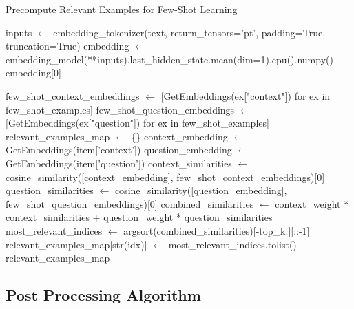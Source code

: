 \documentclass[logo,msc]{infthesis}           %
\begin{document}
\begin{algorithm}
\caption{Precompute Relevant Examples for Few-Shot Learning}
\label{alg:precomputeExamples}
\begin{algorithmic}[1]
    \State inputs $\gets$ embedding\_tokenizer(text, return\_tensors='pt', padding=True, truncation=True)
    \State embedding $\gets$ embedding\_model(**inputs).last\_hidden\_state.mean(dim=1).cpu().numpy()
    \State \Return embedding[0]
\EndFunction

    \State few\_shot\_context\_embeddings $\gets$ [GetEmbeddings(ex["context"]) for ex in few\_shot\_examples]
    \State few\_shot\_question\_embeddings $\gets$ [GetEmbeddings(ex["question"]) for ex in few\_shot\_examples]
    \State relevant\_examples\_map $\gets$ \{\}
        \State context\_embedding $\gets$ GetEmbeddings(item['context'])
        \State question\_embedding $\gets$ GetEmbeddings(item['question'])
        \State context\_similarities $\gets$ cosine\_similarity([context\_embedding], few\_shot\_context\_embeddings)[0]
        \State question\_similarities $\gets$ cosine\_similarity([question\_embedding], few\_shot\_question\_embeddings)[0]
        \State combined\_similarities $\gets$ context\_weight * context\_similarities + question\_weight * question\_similarities
        \State most\_relevant\_indices $\gets$ argsort(combined\_similarities)[-top\_k:][::-1]
        \State relevant\_examples\_map[str(idx)] $\gets$ most\_relevant\_indices.tolist()
    \EndFor
    \State \Return relevant\_examples\_map
\EndFunction



\end{algorithmic}
\end{algorithm}

\subsection{Post Processing Algorithm}
\end{document}
